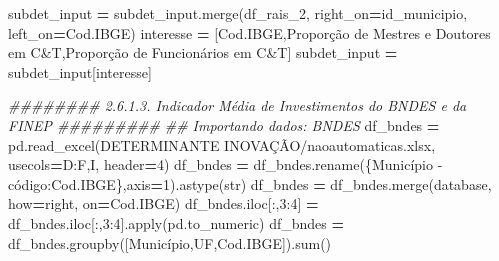 \documentclass[
  12,
  dvipsnames]{article}
\newenvironment{Shaded}{\begin{snugshade}}{\end{snugshade}}
\newcommand{\BuiltInTok}[1]{#1}
\newcommand{\CommentTok}[1]{\textcolor[rgb]{0.56,0.35,0.01}{\textit{#1}}}
\newcommand{\DecValTok}[1]{\textcolor[rgb]{0.00,0.00,0.81}{#1}}
\newcommand{\NormalTok}[1]{#1}
\newcommand{\OperatorTok}[1]{\textcolor[rgb]{0.81,0.36,0.00}{\textbf{#1}}}
\newcommand{\StringTok}[1]{\textcolor[rgb]{0.31,0.60,0.02}{#1}}
\begin{document}
\begin{Shaded}
\begin{Highlighting}[]
\NormalTok{subdet\_input }\OperatorTok{=}\NormalTok{ subdet\_input.merge(df\_rais\_2, right\_on}\OperatorTok{=}\StringTok{\textquotesingle{}id\_municipio\textquotesingle{}}\NormalTok{, left\_on}\OperatorTok{=}\StringTok{\textquotesingle{}Cod.IBGE\textquotesingle{}}\NormalTok{)}
\NormalTok{interesse }\OperatorTok{=}\NormalTok{ [}\StringTok{\textquotesingle{}Cod.IBGE\textquotesingle{}}\NormalTok{,}\StringTok{\textquotesingle{}Proporção de Mestres e Doutores em C\&T\textquotesingle{}}\NormalTok{,}\StringTok{\textquotesingle{}Proporção de Funcionários em C\&T\textquotesingle{}}\NormalTok{]}
\NormalTok{subdet\_input }\OperatorTok{=}\NormalTok{ subdet\_input[interesse]}

\CommentTok{\#\#\#\#\#\#\#\# 2.6.1.3. Indicador Média de Investimentos do BNDES e da FINEP \#\#\#\#\#\#\#\#\#}
\CommentTok{\#\# Importando dados: BNDES}
\NormalTok{df\_bndes }\OperatorTok{=}\NormalTok{ pd.read\_excel(}\StringTok{\textquotesingle{}DETERMINANTE INOVAÇÃO/naoautomaticas.xlsx\textquotesingle{}}\NormalTok{, }
\NormalTok{                         usecols}\OperatorTok{=}\StringTok{\textquotesingle{}D:F,I\textquotesingle{}}\NormalTok{, header}\OperatorTok{=}\DecValTok{4}\NormalTok{)}
\NormalTok{df\_bndes }\OperatorTok{=}\NormalTok{ df\_bndes.rename(\{}\StringTok{\textquotesingle{}Município {-} código\textquotesingle{}}\NormalTok{:}\StringTok{\textquotesingle{}Cod.IBGE\textquotesingle{}}\NormalTok{\},axis}\OperatorTok{=}\DecValTok{1}\NormalTok{).astype(}\BuiltInTok{str}\NormalTok{)}
\NormalTok{df\_bndes }\OperatorTok{=}\NormalTok{ df\_bndes.merge(database, how}\OperatorTok{=}\StringTok{\textquotesingle{}right\textquotesingle{}}\NormalTok{, on}\OperatorTok{=}\StringTok{\textquotesingle{}Cod.IBGE\textquotesingle{}}\NormalTok{)}
\NormalTok{df\_bndes.iloc[:,}\DecValTok{3}\NormalTok{:}\DecValTok{4}\NormalTok{] }\OperatorTok{=}\NormalTok{ df\_bndes.iloc[:,}\DecValTok{3}\NormalTok{:}\DecValTok{4}\NormalTok{].}\BuiltInTok{apply}\NormalTok{(pd.to\_numeric)}
\NormalTok{df\_bndes }\OperatorTok{=}\NormalTok{ df\_bndes.groupby([}\StringTok{\textquotesingle{}Município\textquotesingle{}}\NormalTok{,}\StringTok{\textquotesingle{}UF\textquotesingle{}}\NormalTok{,}\StringTok{\textquotesingle{}Cod.IBGE\textquotesingle{}}\NormalTok{]).}\BuiltInTok{sum}\NormalTok{()}


\end{Highlighting}
\end{Shaded}
\end{document}
